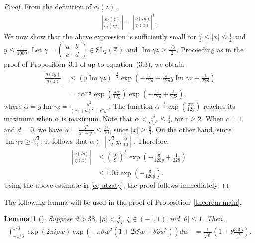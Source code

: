 \documentclass[11pt]{amsart}
\theoremstyle{plain}
\newtheorem{lemma}[theorem]{Lemma}
\renewcommand{\Im}{\operatorname{Im}}
\numberwithin{equation}{section}
\begin{document}
	\begin{proof}
		From the definition of $a_t(z)$,
		\begin{align}\label{eq-atzaty}
			\left| \frac{a_t(z)}{a_t(iy)} \right| = \left| \frac{\eta(iy)}{\eta(z)} \right|^{t}.
		\end{align}
		We now show that the above expression is sufficiently small for $\frac{y}{3}\le |x|\le \frac{1}{2}$ and $y\le \frac{1}{1000}$.
		Let $\gamma= \begin{pmatrix}
			a & b\\
			c & d
		\end{pmatrix}\in \text{SL}_2(\mathbb{Z}) $ and $\Im \gamma z\ge \frac{\sqrt{3}}{2}$.
		Proceeding as in the proof of Proposition~3.1 of \cite{barman2026asymptotic} up to equation~(3.3), we obtain
		\begin{align*}
			\left|\frac{\eta(iy)}{\eta(z)}\right|&\le \left(y\Im \gamma z\right)^{-\frac{1}{4}}\exp\left(-\frac{\pi}{12y}+\frac{\pi}{12y}y\Im \gamma z+\frac{1}{228}\right)\\
			&=:\alpha^{-\frac{1}{4}}\exp\left(\frac{\pi\alpha}{12y}\right)\exp\left(-\frac{\pi}{12y}+\frac{1}{228}\right),
		\end{align*}
		where $\alpha=y\Im \gamma z=\frac{y^{2}}{(cx+d)^{2}+c^{2}y^{2}}$. The function $\alpha^{-\frac{1}{4}}\exp\left(\frac{\pi\alpha}{12y}\right)$ reaches its maximum when $\alpha$ is maximum. Note that  $\alpha<\frac{y^{2}}{c^{2}y^{2}}\le \frac{1}{4}$, for $c\ge 2$. When $c = 1$ and $d = 0$, we have $\alpha=\frac{y^{2}}{x^{2}+y^{2}}\le\frac{9}{10}$, since $|x| \ge \frac{y}{3}$. On the other hand, since $\Im \gamma z \ge \frac{\sqrt{3}}{2}$, it follows that $\alpha \in\left[\frac{\sqrt{3}}{2}y, \frac{9}{10}\right]$. Therefore,
		\begin{align*}
			\left|\frac{\eta(iy)}{\eta(z)}\right|&\le\left(\frac{10}{9}\right)^{\frac{1}{4}}\exp\left(-\frac{\pi}{120y}+\frac{1}{228}\right)  \\
			&\le 1.05 \exp\left(-\frac{\pi}{120y}\right).
		\end{align*}
		Using the above estimate in \eqref{eq-atzaty}, the proof follows immediately.
	\end{proof}
		The following lemma will be used in the proof of Proposition~\ref{theorem-main}.
	\begin{lemma}[{\cite[Lemma 4.1]{tyler2026asymptotics}}]\label{lemma-tyler}
		Suppose $\vartheta>38$, $|\rho|<\frac{2}{25}$, $\xi \in(-1,1)$ and $|\theta|\le 1$. Then,
		\begin{align*}
			\int_{-1/3}^{1/3}\exp\left(2\pi i\rho w\right)\exp\left(-\pi\vartheta w^{2}\left(1+2i\xi w+\theta 3w^{2}\right)\right)dw&=\frac{1}{\sqrt{\vartheta}}\left(1+\theta\frac{3.45}{\vartheta}\right).
		\end{align*}
	\end{lemma}
\end{document}
